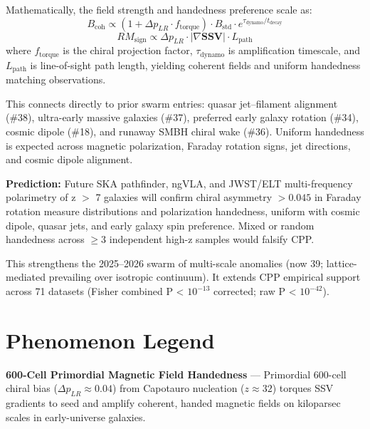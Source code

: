 \documentclass[11pt]{article}
\begin{document}
Mathematically, the field strength and handedness preference scale as:  
\[
B_{\text{coh}} \propto (1 + \Delta p_{LR} \cdot f_{\text{torque}}) \cdot B_{\text{std}} \cdot e^{\tau_{\text{dynamo}}/t_{\text{decay}}}
\]  
\[
RM_{\text{sign}} \propto \Delta p_{LR} \cdot |\nabla \mathbf{SSV}| \cdot L_{\text{path}}
\]  
where $f_{\text{torque}}$ is the chiral projection factor, $\tau_{\text{dynamo}}$ is amplification timescale, and $L_{\text{path}}$ is line-of-sight path length, yielding coherent fields and uniform handedness matching observations.  

This connects directly to prior swarm entries: quasar jet–filament alignment (\#38), ultra-early massive galaxies (\#37), preferred early galaxy rotation (\#34), cosmic dipole (\#18), and runaway SMBH chiral wake (\#36). Uniform handedness is expected across magnetic polarization, Faraday rotation signs, jet directions, and cosmic dipole alignment.  

\textbf{Prediction:} Future SKA pathfinder, ngVLA, and JWST/ELT multi-frequency polarimetry of z $>$ 7 galaxies will confirm chiral asymmetry $>0.045$ in Faraday rotation measure distributions and polarization handedness, uniform with cosmic dipole, quasar jets, and early galaxy spin preference. Mixed or random handedness across $\geq 3$ independent high-z samples would falsify CPP.  

This strengthens the 2025--2026 swarm of multi-scale anomalies (now 39; lattice-mediated prevailing over isotropic continuum). It extends CPP empirical support across 71 datasets (Fisher combined P < $10^{-13}$ corrected; raw P < $10^{-42}$).

\section{Phenomenon Legend}
\textbf{600-Cell Primordial Magnetic Field Handedness} — Primordial 600-cell chiral bias ($\Delta p_{LR} \approx 0.04$) from Capotauro nucleation ($z \approx 32$) torques SSV gradients to seed and amplify coherent, handed magnetic fields on kiloparsec scales in early-universe galaxies.
\end{document}
